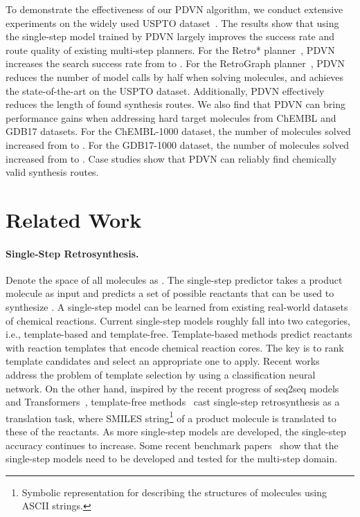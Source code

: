 \documentclass[nohyperref]{article}
\theoremstyle{plain}
\theoremstyle{definition}
\theoremstyle{remark}
\begin{document}
To demonstrate the effectiveness of our PDVN algorithm, we conduct extensive experiments on the widely used USPTO dataset~\cite{lowe2012extraction, chen20retrostar}. 
The results show that using the single-step model trained by PDVN largely improves the success rate and route quality of existing multi-step planners.
For the Retro* planner~\cite{chen20retrostar}, PDVN increases the search success rate from  to .
For the RetroGraph planner~\cite{xie2022retrograph}, PDVN reduces the number of model calls by half when solving  molecules, 
and achieves the state-of-the-art on the USPTO dataset.
Additionally, PDVN effectively 
reduces the length of found synthesis routes. 
We also find that PDVN can bring performance gains when addressing hard target molecules from ChEMBL and GDB17 datasets. 
For the ChEMBL-1000 dataset, the number of molecules solved increased from  to .
For the GDB17-1000 dataset, the number of molecules solved increased from  to . 
Case studies show that PDVN can reliably find chemically valid synthesis routes.  






\section{Related Work}

\paragraph{Single-Step Retrosynthesis.}
Denote the space of all molecules as . 
The single-step predictor takes a product molecule  as input and predicts a set of possible reactants that can be used to synthesize .
A single-step model can be learned from existing real-world datasets of chemical reactions.  
Current single-step models roughly fall into two categories, i.e., template-based and template-free.
Template-based methods predict reactants with reaction templates that encode chemical reaction cores. 
The key is to rank template candidates and select an appropriate one to apply.
Recent works~\cite{segler2017neural, coley2017retrosim, dai2019retrosynthesis, shuan2021localretro} address the problem of template selection by using a classification neural network.
On the other hand, inspired
by the recent progress of seq2seq models~\cite{sutskever2014sequence} and Transformers~\cite{vaswani2017attention},
template-free methods~\cite{liu2017s2s, tetko2020state} cast single-step retrosynthesis as a translation task, where SMILES string\footnote{Symbolic representation for describing the structures of molecules using ASCII strings.} of a product molecule is translated to these of the reactants.
As more single-step models are developed, the single-step accuracy continues to increase. 
Some recent benchmark papers~\cite{hassen2022mind, tu2022retrosynthesis} show that the single-step models need to be developed and tested for the multi-step domain.
\end{document}
